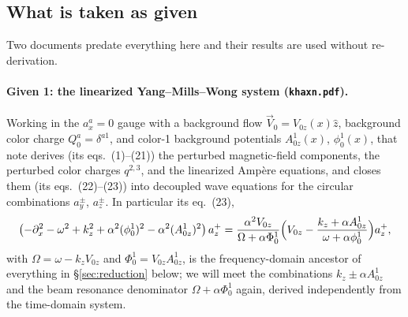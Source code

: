\documentclass[11pt,a4paper]{article}
\numberwithin{equation}{section}
\theoremstyle{remark}
\newcommand{\kz}{k_z}
\begin{document}
\subsection{What is taken as given}
\label{ssec:given}

Two documents predate everything here and their results are used without
re-derivation.

\paragraph{Given 1: the linearized Yang--Mills--Wong system (\texttt{khaxn.pdf}).}
Working in the $a_x^a=0$ gauge with a background flow
$\vec V_0=V_{0z}(x)\hat z$, background color charge $Q_0^a=\delta^{a1}$,
and color-1 background potentials $A^1_{0z}(x)$, $\phi_0^1(x)$, that note
derives (its eqs.~(1)--(21)) the perturbed magnetic-field components, the
perturbed color charges $q^{2,3}$, and the linearized Amp\`ere equations,
and closes them (its eqs.~(22)--(23)) into decoupled wave equations for the
circular combinations $a_y^\pm$, $a_z^\pm$. In particular its eq.~(23),
\begin{equation}
\bigl(-\partial_x^2-\omega^2+\kz^2
+\alpha^2(\phi_0^1)^2-\alpha^2(A^1_{0z})^2\bigr)\,a_z^+
=\frac{\alpha^2 V_{0z}}{\Omega+\alpha\Phi_0^1}
\Bigl(V_{0z}-\frac{\kz+\alpha A^1_{0z}}{\omega+\alpha\phi_0^1}\Bigr)a_z^+ ,
\label{eq:khaxn23}
\end{equation}
with $\Omega=\omega-\kz V_{0z}$ and $\Phi_0^1=V_{0z}A^1_{0z}$, is the
frequency-domain ancestor of everything in \S\ref{sec:reduction} below; we
will meet the combinations $\kz\pm\alpha A^1_{0z}$ and the beam resonance
denominator $\Omega+\alpha\Phi^1_0$ again, derived independently from the
time-domain system.
\end{document}
